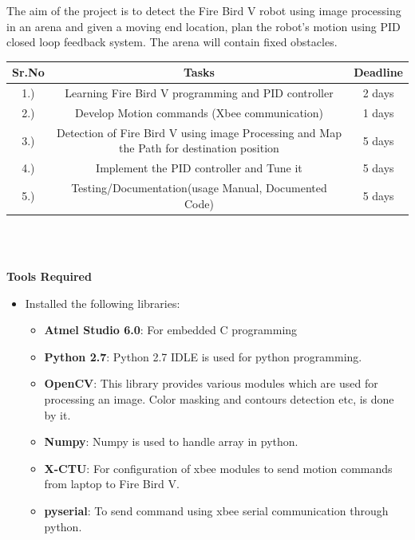 \documentclass[report]{res}
\begin{document}
	The aim of the project is to detect the Fire Bird V robot using image processing in an arena and given a moving end location, plan the robot's motion using PID closed loop feedback system. The arena will contain fixed obstacles. \\
	
	\begin{tabular}{|c|c|c|}
		
		\hline
		\bf Sr.No & \bf Tasks & \bf Deadline \\ 
		\hline
		1.) & Learning Fire Bird V programming and PID controller & 2 days \\
		\hline
		2.) & Develop Motion commands (Xbee communication) & 1 days \\
		\hline
		3.) & Detection of Fire Bird V using image Processing and Map the Path for destination position & 5 days\\
		\hline
		4.) & Implement the PID controller and Tune it & 5 days
		\\ \hline
		5.) & Testing/Documentation(usage Manual, Documented Code) & 5 days
		\\ \hline
		
	\end{tabular} \\ \\
	
	\pagebreak
	
	
	\begin{center}
		\textbf{\huge Tools Required} \\
	\end{center}
	
	\begin{itemize}
		\item Installed the following libraries:
		
		\begin{itemize}
			
			\item \textbf{Atmel Studio 6.0}: For embedded C programming 
			\item \textbf{Python 2.7}: Python 2.7 IDLE is used for python programming. 
			\item \textbf{OpenCV}: This library provides various modules which are used for processing an image. Color masking and contours detection etc, is done by it.
			\item \textbf{Numpy}: Numpy is used to handle array in python.
			\item \textbf{X-CTU}: For configuration of xbee modules to send motion commands from laptop to Fire Bird V.
			\item \textbf{pyserial}: To send command using xbee serial communication through python.
			
		\end{itemize}	
		
	\end{itemize}
	
\end{document}
